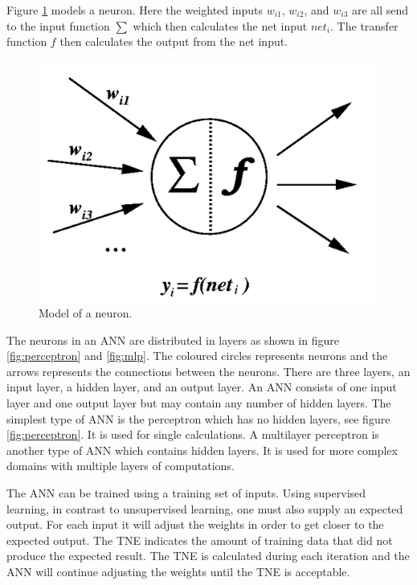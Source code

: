Figure \ref{fig:neuron} models a neuron. Here the weighted inputs $w_{i1}$, $w_{i2}$, and $w_{i3}$ are all send to the input function $\sum$ which then calculates the net input $net_{i}$. The transfer function $f$ then calculates the output from the net input.

\begin{figure}[H]
  \center
    \includegraphics[scale=0.4]{images/nn/neuron.png}
  \caption{Model of a neuron.\cite{neuron} \label{fig:neuron}}
\end{figure}

The neurons in an ANN are distributed in layers as shown in figure \ref{fig:perceptron} and \ref{fig:mlp}. The coloured circles represents neurons and the arrows represents the connections between the neurons. There are three layers, an input layer, a hidden layer, and an output layer. An ANN consists of one input layer and one output layer but may contain any number of hidden layers. The simplest type of ANN is the perceptron which has no hidden layers, see figure \ref{fig:perceptron}. It is used for single calculations. A multilayer perceptron is another type of ANN which contains hidden layers. It is used for more complex domains with multiple layers of computations. 


\vspace{4mm}


The ANN can be trained using a training set of inputs. Using supervised learning, in contrast to unsupervised learning, one must also supply an expected output. For each input it will adjust the weights in order to get closer to the expected output. The TNE indicates the amount of training data that did not produce the expected result. The TNE is calculated during each iteration and the ANN will continue adjusting the weights until the TNE is acceptable. 

